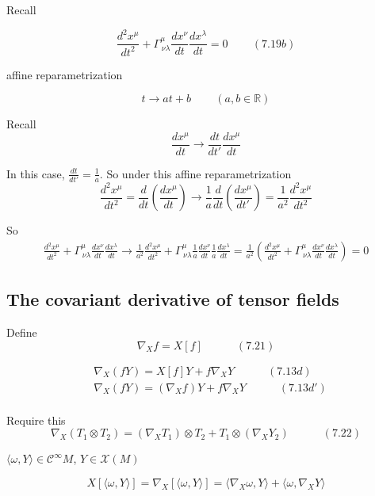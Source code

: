 \documentclass{book}
\begin{document}
Recall

\[
\frac{d^2 x^{\mu} }{dt^2} + \Gamma^{\mu}_{ \, \nu \lambda} \frac{dx^{\nu}}{ dt} \frac{dx^{\lambda}}{ dt} = 0 \quad \quad \, (7.19b)
\]

affine reparametrization

\[
t\to at +b \quad \quad \, (a,b \in \mathbb{R})
\]

Recall 
\[
\frac{dx^{\mu}}{dt} \to \frac{dt}{dt'} \frac{dx^{\mu} }{dt}
\]

In this case, $\frac{dt}{dt'} = \frac{1}{a}$.  So under this affine reparametrization
\[
\frac{d^2 x^{\mu}}{dt^2} = \frac{d}{dt} \left( \frac{dx^{\mu}}{dt} \right) \to \frac{1}{a} \frac{d}{dt} \left( \frac{dx^{\mu} }{ dt'} \right) = \frac{1}{a^2} \frac{d^2 x^{\mu} }{dt^2}
\]

So
\[
\begin{gathered}
  \frac{d^2 x^{\mu}}{dt^2} + \Gamma^{\mu}_{ \, \nu \lambda} \frac{dx^{\nu} }{dt} \frac{dx^{\lambda}}{dt} \to   \frac{1}{a^2} \frac{d^2 x^{\mu}}{dt^2} + \Gamma^{\mu}_{ \, \nu \lambda} \frac{1}{a} \frac{dx^{\nu} }{dt} \frac{1}{a} \frac{dx^{\lambda}}{dt} = \frac{1}{a^2} \left( \frac{d^2 x^{\mu} }{ dt^2} + \Gamma^{\mu }_{ \, \nu \lambda} \frac{dx^{\nu }}{dt} \frac{dx^{\lambda} }{dt} \right) = 0 
\end{gathered}
\]

\subsection{ The covariant derivative of tensor fields }

Define 
\[
\nabla_X f = X[f] \quad \quad \quad (7.21)
\]

\[
\begin{aligned}
  & \nabla_X (fY) = X[f] Y + f\nabla_X Y \quad \quad \quad (7.13d) \\ 
  & \nabla_X (fY) = (\nabla_X f) Y + f\nabla_X Y \quad \quad \quad (7.13d') \\ 
\end{aligned}
\]

Require this 
\begin{equation}
  \nabla_X (T_1 \otimes T_2 ) = (\nabla_X T_1) \otimes T_2 + T_1 \otimes (\nabla_X Y_2) \quad \quad \quad (7.22)
\end{equation}

$\langle \omega, Y \rangle \in \mathcal{C}^{\infty}M$, $Y \in \mathcal{X}(M)$

\[
X[\langle \omega, Y \rangle ] = \nabla_X[ \langle \omega, Y \rangle ] = \langle \nabla_X \omega, Y \rangle + \langle \omega, \nabla_X Y \rangle
\]
\end{document}
